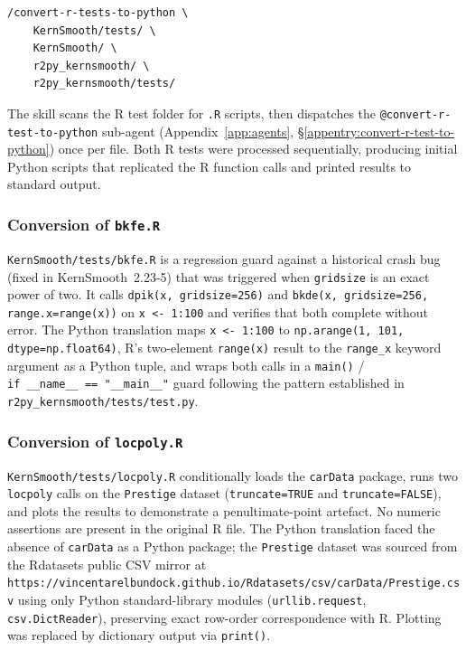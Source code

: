 \documentclass[12pt,a4paper]{article}
\begin{document}
\begin{lstlisting}[style=shell]
/convert-r-tests-to-python \
    KernSmooth/tests/ \
    KernSmooth/ \
    r2py_kernsmooth/ \
    r2py_kernsmooth/tests/
\end{lstlisting}

The skill scans the R test folder for \texttt{.R} scripts, then dispatches the \texttt{@convert-r-test-to-python} sub-agent (Appendix~\ref{app:agents}, \S\ref{appentry:convert-r-test-to-python}) once per file. Both R tests were processed sequentially, producing initial Python scripts that replicated the R function calls and printed results to standard output.

\subsubsection{Conversion of \texttt{bkfe.R}}

\texttt{KernSmooth/tests/bkfe.R} is a regression guard against a historical crash bug (fixed in KernSmooth~2.23-5) that was triggered when \texttt{gridsize} is an exact power of two. It calls \texttt{dpik(x, gridsize=256)} and \texttt{bkde(x, gridsize=256, range.x=range(x))} on \texttt{x~<-~1:100} and verifies that both complete without error. The Python translation maps \texttt{x <- 1:100} to \texttt{np.arange(1, 101, dtype=np.float64)}, R's two-element \texttt{range(x)} result to the \texttt{range\_x} keyword argument as a Python tuple, and wraps both calls in a \texttt{main()} / \texttt{if~\_\_name\_\_~==~"\_\_main\_\_"} guard following the pattern established in \texttt{r2py\_kernsmooth/tests/test.py}.

\subsubsection{Conversion of \texttt{locpoly.R}}

\texttt{KernSmooth/tests/locpoly.R} conditionally loads the \texttt{carData} package, runs two \texttt{locpoly} calls on the \texttt{Prestige} dataset (\texttt{truncate=TRUE} and \texttt{truncate=FALSE}), and plots the results to demonstrate a penultimate-point artefact. No numeric assertions are present in the original R file. The Python translation faced the absence of \texttt{carData} as a Python package; the \texttt{Prestige} dataset was sourced from the Rdatasets public CSV mirror at \texttt{https://vincentarelbundock.github.io/Rdatasets/csv/carData/Prestige.csv} using only Python standard-library modules (\texttt{urllib.request}, \texttt{csv.DictReader}), preserving exact row-order correspondence with R. Plotting was replaced by dictionary output via \texttt{print()}.
\end{document}
